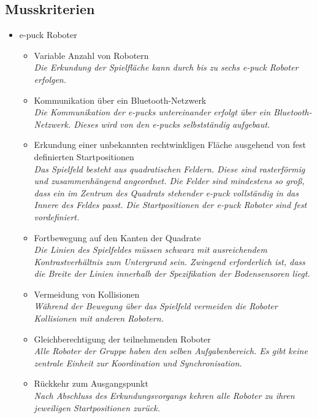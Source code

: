 \documentclass[10pt,a4paper]{article}
\begin{document}
		\subsection{Musskriterien}
			\begin{itemize}
				\item e-puck Roboter
				\begin{itemize}
					\item Variable Anzahl von Robotern
						\\ \textsl{Die Erkundung der Spielfläche kann durch bis zu sechs e-puck Roboter erfolgen.}
					\item Kommunikation über ein Bluetooth-Netzwerk
						\\ \textsl{Die Kommunikation der e-pucks untereinander erfolgt über ein Bluetooth-Netzwerk.
						   Dieses wird von den e-pucks selbstständig aufgebaut.}
					\item Erkundung einer unbekannten rechtwinkligen Fläche ausgehend von fest definierten Startpositionen
						\\ \textsl{Das Spielfeld besteht aus quadratischen Feldern. Diese sind rasterförmig und
						   zusammenhängend angeordnet. Die Felder sind mindestens so groß, dass ein im Zentrum des Quadrats
						   stehender e-puck vollständig in das Innere des Feldes passt. Die Startpositionen der e-puck Roboter sind
						   fest vordefiniert.}
					\item Fortbewegung auf den Kanten der Quadrate
						\\ \textsl{Die Linien des Spielfeldes müssen schwarz mit ausreichendem Kontrastverhältnis
						    zum Untergrund sein. Zwingend erforderlich ist, dass die Breite der Linien innerhalb der Spezifikation der
							Bodensensoren liegt.}		
					\item Vermeidung von Kollisionen
						\\ \textsl{Während der Bewegung über das Spielfeld vermeiden die Roboter Kollisionen mit anderen Robotern.}	
					\item Gleichberechtigung der teilnehmenden Roboter
						\\ \textsl{Alle Roboter der Gruppe haben den selben Aufgabenbereich. Es gibt keine zentrale Einheit
							zur Koordination und Synchronisation.}	
					\item Rückkehr zum Ausgangspunkt
						\\ \textsl{Nach Abschluss des Erkundungsvorgangs kehren alle Roboter zu ihren jeweiligen Startpositionen
							zurück.}	
				\end{itemize}

\end{itemize}
\end{document}
